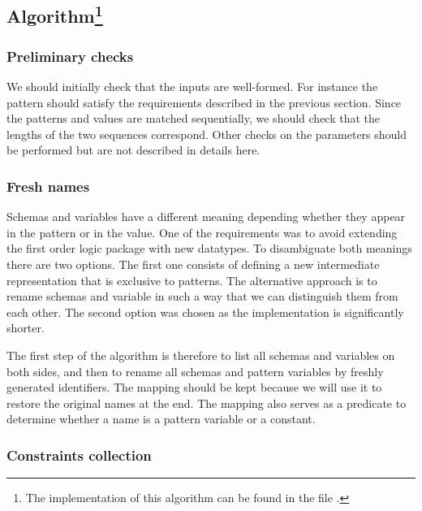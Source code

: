 \subsection{Algorithm\texorpdfstring{\footnote{The implementation of this algorithm can be found in the file \href{https://github.com/FlorianCassayre/master-project/blob/master/src/main/scala/me/cassayre/florian/masterproject/front/proof/unification/UnificationUtils.scala}{}.}}{Lg}}

\subsubsection{Preliminary checks}

We should initially check that the inputs are well-formed. For instance the pattern should satisfy the requirements described in the previous section. Since the patterns and values are matched sequentially, we should check that the lengths of the two sequences correspond. Other checks on the parameters should be performed but are not described in details here.

\subsubsection{Fresh names}

Schemas and variables have a different meaning depending whether they appear in the pattern or in the value. One of the requirements was to avoid extending the first order logic package with new datatypes. To disambiguate both meanings there are two options. The first one consists of defining a new intermediate representation that is exclusive to patterns. The alternative approach is to rename schemas and variable in such a way that we can distinguish them from each other. The second option was chosen as the implementation is significantly shorter.

The first step of the algorithm is therefore to list all schemas and variables on both sides, and then to rename all schemas and pattern variables by freshly generated identifiers. The mapping should be kept because we will use it to restore the original names at the end. The mapping also serves as a predicate to determine whether a name is a pattern variable or a constant.

\subsubsection{Constraints collection}


